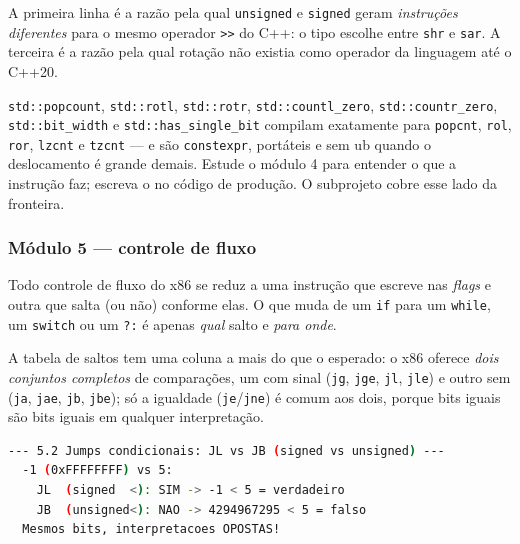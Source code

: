 A primeira linha é a razão pela qual \texttt{unsigned} e \texttt{signed} geram
\emph{instruções diferentes} para o mesmo operador \texttt{>>} do C++: o tipo
escolhe entre \texttt{shr} e \texttt{sar}. A terceira é a razão pela qual
rotação não existia como operador da linguagem até o C++20.

\begin{regra}
\texttt{std::popcount}, \texttt{std::rotl}, \texttt{std::rotr},
\texttt{std::countl\_zero}, \texttt{std::countr\_zero},
\texttt{std::bit\_width} e \texttt{std::has\_single\_bit} compilam exatamente
para \texttt{popcnt}, \texttt{rol}, \texttt{ror}, \texttt{lzcnt} e
\texttt{tzcnt} --- e são \texttt{constexpr}, portáteis e sem \gls{ub} quando o
deslocamento é grande demais. Estude o módulo 4 para entender o que a instrução
faz; escreva o  no código de produção. O subprojeto
 cobre esse lado da fronteira.
\end{regra}

\subsubsection{Módulo 5 --- controle de fluxo}

\begin{porque}
Todo controle de fluxo do x86 se reduz a uma instrução que escreve nas
\emph{flags} e outra que salta (ou não) conforme elas. O que muda de um
\texttt{if} para um \texttt{while}, um \texttt{switch} ou um \texttt{?:} é
apenas \emph{qual} salto e \emph{para onde}.
\end{porque}

A tabela de saltos tem uma coluna a mais do que o esperado: o x86 oferece
\emph{dois conjuntos completos} de comparações, um com sinal
(\texttt{jg}, \texttt{jge}, \texttt{jl}, \texttt{jle}) e outro sem
(\texttt{ja}, \texttt{jae}, \texttt{jb}, \texttt{jbe}); só a igualdade
(\texttt{je}/\texttt{jne}) é comum aos dois, porque bits iguais são bits iguais
em qualquer interpretação.

\begin{lstlisting}[style=bt, language=bash,
    caption={Saída medida de \texttt{dist/bin/asm\_05\_control\_flow}: os
             mesmos 32 bits, dois veredictos opostos.}]
--- 5.2 Jumps condicionais: JL vs JB (signed vs unsigned) ---
  -1 (0xFFFFFFFF) vs 5:
    JL  (signed  <): SIM -> -1 < 5 = verdadeiro
    JB  (unsigned<): NAO -> 4294967295 < 5 = falso
  Mesmos bits, interpretacoes OPOSTAS!
\end{lstlisting}


